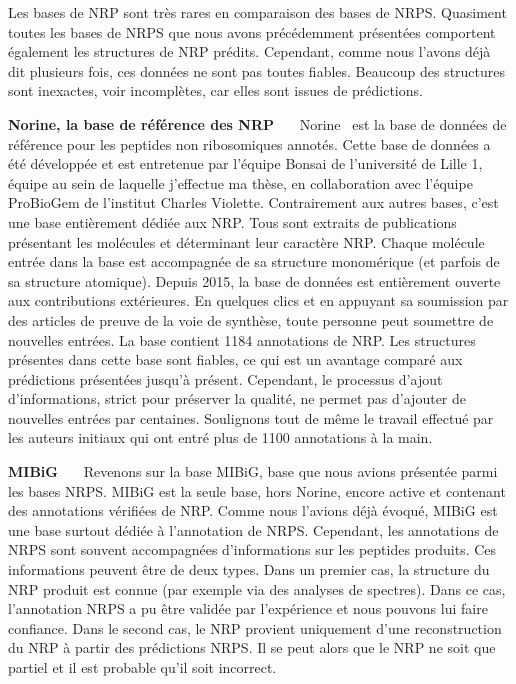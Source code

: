 \label{bdd_nrp}

Les bases de NRP sont très rares en comparaison des bases de NRPS.
Quasiment toutes les bases de NRPS que nous avons précédemment présentées comportent également les structures de NRP prédits.
Cependant, comme nous l'avons déjà dit plusieurs fois, ces données ne sont pas toutes fiables.
Beaucoup des structures sont inexactes, voir incomplètes, car elles sont issues de prédictions.

\textbf{Norine, la base de référence des NRP}~~~
Norine~\cite{caboche_norine:_2008,flissi_norine_2016} est la base de données de référence pour les peptides non ribosomiques annotés.
Cette base de données a été développée et est entretenue par l'équipe Bonsai de l'université de Lille 1, équipe au sein de laquelle j'effectue ma thèse, en collaboration avec l'équipe ProBioGem de l'institut Charles Violette.
Contrairement aux autres bases, c'est une base entièrement dédiée aux NRP.
Tous sont extraits de publications présentant les molécules et déterminant leur caractère NRP.
Chaque molécule entrée dans la base est accompagnée de sa structure monomérique (et parfois de sa structure atomique).
Depuis 2015, la base de données est entièrement ouverte aux contributions extérieures.
En quelques clics et en appuyant sa soumission par des articles de preuve de la voie de synthèse, toute personne peut soumettre de nouvelles entrées.
La base contient 1184 annotations de NRP.
Les structures présentes dans cette base sont fiables, ce qui est un avantage comparé aux prédictions présentées jusqu'à présent.
Cependant, le processus d'ajout d'informations, strict pour préserver la qualité, ne permet pas d'ajouter de nouvelles entrées par centaines.
Soulignons tout de même le travail effectué par les auteurs initiaux qui ont entré plus de 1100 annotations à la main.


\textbf{MIBiG}~~~
Revenons sur la base MIBiG, base que nous avions présentée parmi les bases NRPS.
MIBiG est la seule base, hors Norine, encore active et contenant des annotations vérifiées de NRP.
Comme nous l'avions déjà évoqué, MIBiG est une base surtout dédiée à l'annotation de NRPS.
Cependant, les annotations de NRPS sont souvent accompagnées d'informations sur les peptides produits.
Ces informations peuvent être de deux types.
Dans un premier cas, la structure du NRP produit est connue (par exemple via des analyses de spectres).
Dans ce cas, l'annotation NRPS a pu être validée par l'expérience et nous pouvons lui faire confiance.
Dans le second cas, le NRP provient uniquement d'une reconstruction du NRP à partir des prédictions NRPS.
Il se peut alors que le NRP ne soit que partiel et il est probable qu'il soit incorrect.

